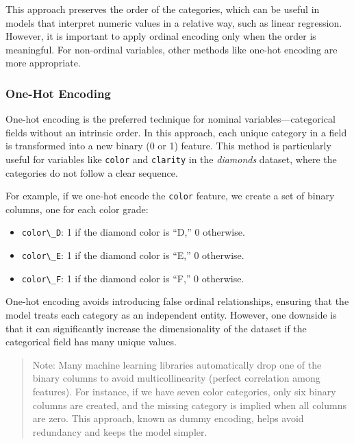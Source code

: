 \documentclass[
  11pt,
]{book}
\newcommand{\passthrough}[1]{#1}
\providecommand{\tightlist}{%
  \setlength{\itemsep}{0pt}\setlength{\parskip}{0pt}}
\theoremstyle{definition}
\theoremstyle{definition}
\theoremstyle{definition}
\theoremstyle{definition}
\theoremstyle{remark}
\begin{document}
This approach preserves the order of the categories, which can be useful in models that interpret numeric values in a relative way, such as linear regression. However, it is important to apply ordinal encoding only when the order is meaningful. For non-ordinal variables, other methods like one-hot encoding are more appropriate.

\subsubsection*{One-Hot Encoding}\label{one-hot-encoding}


One-hot encoding is the preferred technique for nominal variables---categorical fields without an intrinsic order. In this approach, each unique category in a field is transformed into a new binary (0 or 1) feature. This method is particularly useful for variables like \passthrough{\lstinline!color!} and \passthrough{\lstinline!clarity!} in the \emph{diamonds} dataset, where the categories do not follow a clear sequence.

For example, if we one-hot encode the \passthrough{\lstinline!color!} feature, we create a set of binary columns, one for each color grade:

\begin{itemize}
\tightlist
\item
  \passthrough{\lstinline!color\_D!}: 1 if the diamond color is ``D,'' 0 otherwise.
\item
  \passthrough{\lstinline!color\_E!}: 1 if the diamond color is ``E,'' 0 otherwise.
\item
  \passthrough{\lstinline!color\_F!}: 1 if the diamond color is ``F,'' 0 otherwise.
\end{itemize}

One-hot encoding avoids introducing false ordinal relationships, ensuring that the model treats each category as an independent entity. However, one downside is that it can significantly increase the dimensionality of the dataset if the categorical field has many unique values.

\begin{quote}
Note: Many machine learning libraries automatically drop one of the binary columns to avoid multicollinearity (perfect correlation among features). For instance, if we have seven color categories, only six binary columns are created, and the missing category is implied when all columns are zero. This approach, known as dummy encoding, helps avoid redundancy and keeps the model simpler.
\end{quote}
\end{document}
